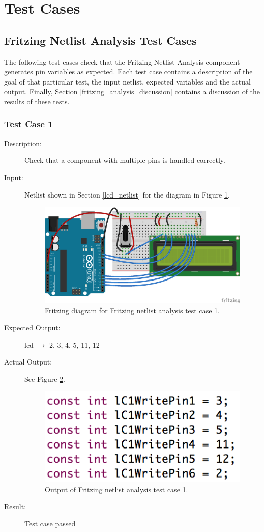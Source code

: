\documentclass{UoYCSproject}
\begin{document}
\section{Test Cases} \label{test_cases}
	
\subsection{Fritzing Netlist Analysis Test Cases}
The following test cases check that the Fritzing Netlist Analysis component generates pin variables as expected. Each test case contains a description of the goal of that particular test, the input netlist, expected variables and the actual output. Finally, Section \ref{fritzing_analysis_discussion} contains a discussion of the results of these tests.

\subsubsection{Test Case 1}
\begin{description}
\item[Description:] Check that a component with multiple pins is handled correctly.
\item[Input:] Netlist shown in Section \ref{lcd_netlist} for the diagram in Figure \ref{fig:lcd_test}.
\begin{figure}[h!]
  \centering
  \includegraphics[width=0.5\linewidth]{graphics/LCD_test.png}
  \caption{Fritzing diagram for Fritzing netlist analysis test case 1.}
  \label{fig:lcd_test}
\end{figure}
\item[Expected Output:] lcd $\rightarrow$ 2, 3, 4, 5, 11, 12
\item[Actual Output:] See Figure \ref{fig:lcd_output}.
\begin{figure}[h!]
  \centering
  \includegraphics[width=0.4\linewidth]{graphics/lcd_test_output.png}
  \caption{Output of Fritzing netlist analysis test case 1.}
  \label{fig:lcd_output}
\end{figure}
\item[Result:] Test case passed
\end{description}
\end{document}
